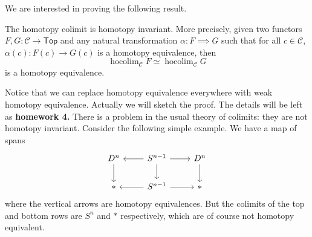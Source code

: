\documentclass{amsart}
\DeclareMathOperator{\hocolim}{hocolim}
\begin{document}
We are interested in proving the following result.
\begin{theorem}
    The homotopy colimit is homotopy invariant. More precisely, given two functors $F,G: \mathcal{C}\to\mathsf{Top}$
    and any natural transformation $\alpha:F\implies G$ such that for all $c\in\mathcal{C}$,
    $\alpha(c):F(c)\to G(c)$ is a homotopy equivalence, then
    \begin{equation*}
        \hocolim_{\mathcal{C}} F \simeq \hocolim_{\mathcal{C}} G
    \end{equation*}
    is a homotopy equivalence.
\end{theorem}
Notice that we can replace homotopy equivalence everywhere with weak homotopy equivalence.
Actually we will sketch the proof. The details will be left as \textbf{homework 4.}
There is a problem in the usual theory of colimits: they are not homotopy invariant.
Consider the following simple example. We have a map of spans
\begin{equation*}
    \begin{tikzcd}
        D^n\dar & S^{n-1}\lar\dar\rar & D^n\dar \\
        * & S^{n-1}\lar\rar & *
    \end{tikzcd}
\end{equation*}
where the vertical arrows are homotopy equivalences. But the colimits of
the top and bottom rows are $S^n$ and $*$ respectively, which are of course not
homotopy equivalent.
\end{document}
